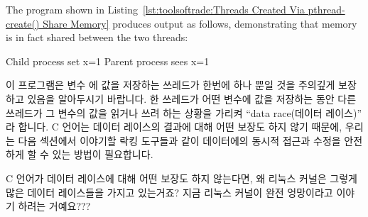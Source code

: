 The program shown in
Listing~\ref{lst:toolsoftrade:Threads Created Via pthread-create() Share Memory}
produces output as follows, demonstrating that memory is in fact
shared between the two threads:
\fi

\begin{VerbatimU}
Child process set x=1
Parent process sees x=1
\end{VerbatimU}

이 프로그램은 변수  에 값을 저장하는 쓰레드가 한번에 하나 뿐일 것을
주의깊게 보장하고 있음을 알아두시기 바랍니다.
한 쓰레드가 어떤 변수에 값을 저장하는 동안 다른 쓰레드가 그 변수의 값을 읽거나
쓰려 하는 상황을 가리켜 ``data race(데이터 레이스)'' 라 합니다.
C 언어는 데이터 레이스의 결과에 대해 어떤 보장도 하지 않기 때문에, 우리는 다음
섹션에서 이야기할 락킹 도구들과 같이 데이터에의 동시적 접근과 수정을 안전하게
할 수 있는 방법이 필요합니다.

\QuickQuiz{}
	C 언어가 데이터 레이스에 대해 어떤 보장도 하지 않는다면, 왜 리눅스
	커널은 그렇게 많은 데이터 레이스들을 가지고 있는거죠?
	지금 리눅스 커널이 완전 엉망이라고 이야기 하려는 거예요???
	\iffalse

